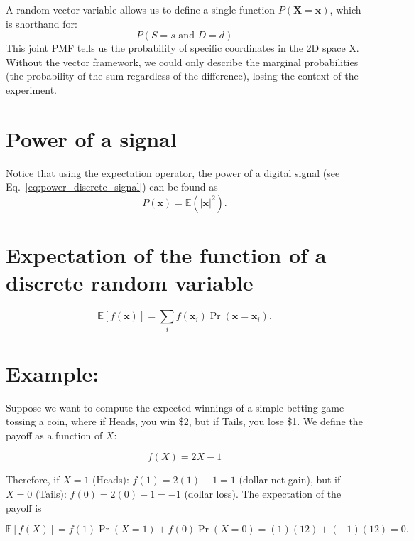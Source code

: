 A random vector variable allows us to define a single function
$P(\mathbf{X}=\mathbf{x})$, which is shorthand for:
\begin{equation}
P(S = s \text{ and } D = d)
\end{equation}
This joint \gls{PMF} tells us the probability of specific coordinates
in the 2D space X. Without the vector framework, we could only
describe the marginal probabilities (the probability of the sum
regardless of the difference), losing the context of the experiment.


\section{Power of a signal}

Notice that using the expectation operator, the power of a digital
signal (see Eq.~\ref{eq:power_discrete_signal}) can be found as
\begin{equation}
  P(\mathbf{x}) = \mathbb{E}(|\mathbf{x}|^2).
  \label{eq:power_as_expectation}
\end{equation}


\section{Expectation of the function of a discrete random variable}

\begin{equation}
  \mathbb{E}[f(\mathbf{x})]=\sum_if(\mathbf{x}_i)\Pr(\mathbf{x}=\mathbf{x}_i).
  \label{eq:expectation_of_function}
\end{equation}

\section*{Example:}
Suppose we want to compute the expected winnings of a simple betting game tossing a coin, where if Heads, you win \$2, but if Tails, you lose \$1. We define the payoff as a function of $X$:

\begin{equation*}
  f(X)=2X-1
\end{equation*}

Therefore, if $X=1$ (Heads): $f(1)=2(1)-1=1$ (dollar net gain), but if $X=0$ (Tails): $f(0)=2(0)-1=-1$ (dollar loss). The expectation of the payoff is

\begin{equation*}
\mathbb{E}[f(X)]=f(1)\Pr(X=1)+f(0)\Pr(X=0) = (1)(12)+(-1)(12)=0.
\end{equation*}

